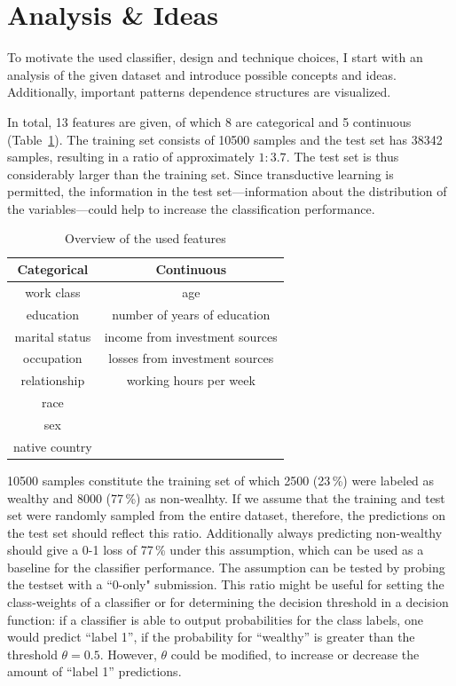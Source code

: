 \documentclass[a4paper]{article}
\begin{document}
\section{Analysis \& Ideas}
\label{sec:analysis}

To motivate the used classifier, design and technique
choices, I start with an analysis of the given dataset and introduce possible concepts and ideas. Additionally, important patterns dependence structures are visualized.

In total, 13 features are given, of which 8 are categorical and 5 continuous (Table~\ref{tab:features}).
The training set consists of 10500 samples and the test set has 38342 samples, resulting in a ratio of approximately $1:3.7$.
The test set is thus considerably larger than the training set.
Since transductive learning is permitted, the information in the test set---information about the distribution of the variables---could help to increase the classification performance.

\begin{table}[h]
  \centering
  \begin{tabular}{cc}
    \toprule
  Categorical  & Continuous                     \\
    \midrule
    work class & age                            \\
    education  & number of years of education   \\
marital status & income from investment sources \\
occupation     & losses from investment sources \\
relationship   & working hours per week         \\
race           &                                \\
sex            &                                \\
native country &                                \\
      \bottomrule
  \end{tabular}
  \caption{{Overview of the used features}}
  \label{tab:features}
\end{table}

10500 samples constitute the training set of which 2500 (23\,\%) were labeled as wealthy and 8000 (77\,\%) as non-wealhty. If we assume that the training and test set were randomly sampled from the entire dataset, therefore, the predictions on the test set should reflect this ratio. Additionally always predicting non-wealthy should give a 0-1 loss of 77\,\% under this assumption, which can be used as a baseline for the classifier performance. The assumption can be tested by probing the testset with a ``0-only" submission. This ratio might be useful for setting the class-weights of a classifier or for determining the decision threshold in a decision function: if a classifier is able to output probabilities for the class labels, one would predict ``label 1'', if the probability for ``wealthy'' is greater than the threshold $\theta = 0.5$. However, $\theta$ could be modified, to increase or decrease the amount of ``label 1'' predictions.
\end{document}
